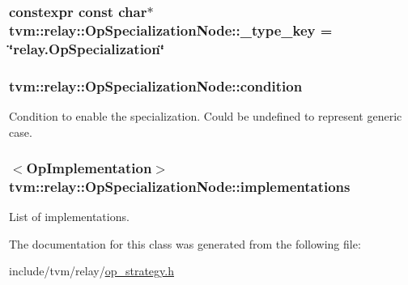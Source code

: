 \subsubsection[{\texorpdfstring{\+\_\+type\+\_\+key}{_type_key}}]{\setlength{\rightskip}{0pt plus 5cm}constexpr const char$\ast$ tvm\+::relay\+::\+Op\+Specialization\+Node\+::\+\_\+type\+\_\+key = \char`\"{}relay.\+Op\+Specialization\char`\"{}\hspace{0.3cm}{\ttfamily [static]}}\hypertarget{classtvm_1_1relay_1_1OpSpecializationNode_afb3931d103169a872632a7bd949d0573}{}\label{classtvm_1_1relay_1_1OpSpecializationNode_afb3931d103169a872632a7bd949d0573}
\subsubsection[{\texorpdfstring{condition}{condition}}]{ tvm\+::relay\+::\+Op\+Specialization\+Node\+::condition}\hypertarget{classtvm_1_1relay_1_1OpSpecializationNode_ad5875014bf3e9ce9ffe49af09bebdb99}{}\label{classtvm_1_1relay_1_1OpSpecializationNode_ad5875014bf3e9ce9ffe49af09bebdb99}


Condition to enable the specialization. Could be undefined to represent generic case. 

\subsubsection[{\texorpdfstring{implementations}{implementations}}]{$<${\bf Op\+Implementation}$>$ tvm\+::relay\+::\+Op\+Specialization\+Node\+::implementations}\hypertarget{classtvm_1_1relay_1_1OpSpecializationNode_a8d5ffe97532ff7b663d2b7da09bd9042}{}\label{classtvm_1_1relay_1_1OpSpecializationNode_a8d5ffe97532ff7b663d2b7da09bd9042}


List of implementations. 



The documentation for this class was generated from the following file\+:\begin{DoxyCompactItemize}
\item 
include/tvm/relay/\hyperlink{op__strategy_8h}{op\+\_\+strategy.\+h}\end{DoxyCompactItemize}
